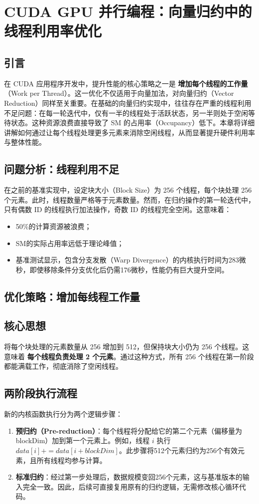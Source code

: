 \section{CUDA GPU 并行编程：向量归约中的线程利用率优化}

\subsection{引言}
在 CUDA 应用程序开发中，提升性能的核心策略之一是 \textbf{增加每个线程的工作量}（Work per Thread）。这一优化不仅适用于向量加法，对向量归约（Vector Reduction）同样至关重要。在基础的向量归约实现中，往往存在严重的线程利用不足问题：在每一轮迭代中，仅有一半的线程处于活跃状态，另一半则处于空闲等待状态。这种资源浪费直接导致了 SM 的占用率（Occupancy）低下。本章将详细讲解如何通过让每个线程处理更多元素来消除空闲线程，从而显著提升硬件利用率与整体性能。

\subsection{问题分析：线程利用不足}
在之前的基准实现中，设定块大小（Block Size）为 256 个线程，每个块处理 256 个元素。此时，线程数量严格等于元素数量。然而，在归约操作的第一轮迭代中，只有偶数 ID 的线程执行加法操作，奇数 ID 的线程完全空闲。这意味着：
\begin{itemize}
    \item 50\%的计算资源被浪费；
    \item SM的实际占用率远低于理论峰值；
    \item 基准测试显示，包含分支发散（Warp Divergence）的内核执行时间为283微秒，即使移除条件分支优化后仍需176微秒，性能仍有巨大提升空间。
\end{itemize}

\subsection{优化策略：增加每线程工作量}
\subsection{核心思想}
将每个块处理的元素数量从 256 增加到 512，但保持块大小仍为 256 个线程。这意味着 \textbf{每个线程负责处理 2 个元素}。通过这种方式，所有 256 个线程在第一阶段都能满载工作，彻底消除了空闲线程。

\subsection{两阶段执行流程}
新的内核函数执行分为两个逻辑步骤：
\begin{enumerate}
    \item \textbf{预归约（Pre-reduction）}：每个线程将分配给它的第二个元素（偏移量为 blockDim）加到第一个元素上。例如，线程 $i$ 执行 $data[i] += data[i + blockDim]$。此步骤将512个元素归约为256个有效元素，且所有线程均参与计算。
    \item \textbf{标准归约}：经过第一步处理后，数据规模变回256个元素，这与基准版本的输入完全一致。因此，后续可直接复用原有的归约逻辑，无需修改核心循环代码。
\end{enumerate}

